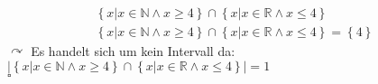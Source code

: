 \begin{eqnarray}
	\left\{ x \vert x \in \mathbb{N} \land x \ge 4 \right\} \cap \left\{ x \vert x \in \mathbb{R} \land x \le 4\right\} \\
		\left\{ x \vert x \in \mathbb{N} \land x \ge 4 \right\} \cap \left\{ x \vert x \in \mathbb{R} \land x \le 4\right\} = \left\{4\right\}
\end{eqnarray}
$\curvearrowright$ Es handelt sich um kein Intervall da: \\ $\vert \left\{ x \vert x \in \mathbb{N} \land x \ge 4 \right\} \cap \left\{ x \vert x \in \mathbb{R} \land x \le 4\right\} \vert =1 $ \\
$\square$